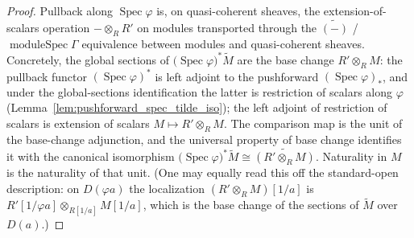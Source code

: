 \begin{proof}
  Pullback along \(\operatorname{Spec}\varphi\) is, on quasi-coherent sheaves, the
  extension-of-scalars operation \(- \otimes_R R'\) on modules transported through
  the \(\widetilde{(-)}\) / \(\operatorname{moduleSpec}\Gamma\) equivalence between
  modules and quasi-coherent sheaves. Concretely, the global sections of
  \(\bigl(\operatorname{Spec}\varphi\bigr)^{*}\widetilde{M}\) are the base change
  \(R' \otimes_R M\): the pullback functor \((\operatorname{Spec}\varphi)^{*}\) is
  left adjoint to the pushforward \((\operatorname{Spec}\varphi)_{*}\), and under
  the global-sections identification the latter is restriction of scalars along
  \(\varphi\) (Lemma~\ref{lem:pushforward_spec_tilde_iso}); the left adjoint of
  restriction of scalars is extension of scalars \(M \mapsto R' \otimes_R M\). The
  comparison map is the unit of the base-change adjunction, and the universal
  property of base change identifies it with the canonical isomorphism
  \(\bigl(\operatorname{Spec}\varphi\bigr)^{*}\widetilde{M} \cong
  \widetilde{(R' \otimes_R M)}\). Naturality in \(M\) is the naturality of that
  unit. (One may equally read this off the standard-open description: on
  \(D(\varphi a)\) the localization \((R' \otimes_R M)[1/a]\) is
  \(R'[1/\varphi a] \otimes_{R[1/a]} M[1/a]\), which is the base change of the
  sections of \(\widetilde M\) over \(D(a)\).)
\end{proof}

